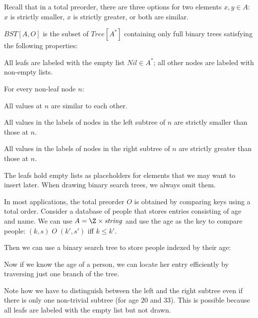 Recall that in a total preorder, there are three options for two elements $x,y\in A$: $x$ is strictly smaller, $x$ is strictly greater, or both are similar.

\begin{definition}
$BST[A,O]$ is the subset of $Tree[A^*]$ containing only full binary trees satisfying the following properties:
\begin{compactitem}
 \item All leafs are labeled with the empty list $Nil\in A^*$; all other nodes are labeled with non-empty lists.
 \item For every non-leaf node $n$:
  \begin{compactitem}
    \item All values at $n$ are similar to each other.
    \item All values in the labels of nodes in the left subtree of $n$ are strictly smaller than those at $n$.
    \item All values in the labels of nodes in the right subtree of $n$ are strictly greater than those at $n$.
  \end{compactitem}
\end{compactitem}
\end{definition}

The leafs hold empty lists as placeholders for elements that we may want to insert later.
When drawing binary search trees, we always omit them.

\begin{example}
In most applications, the total preorder $O$ is obtained by comparing keys using a total order.
Consider a database of people that stores entries consisting of age and name.
We can use $A=\Z\times\String$ and use the age as the key to compare people: $(k,s) \; O \;(k',s')$ iff $k\leq k'$.

Then we can use a binary search tree to store people indexed by their age:
\begin{center}
\end{center}
Now if we know the age of a person, we can locate her entry efficiently by traversing just one branch of the tree.

Note how we have to distinguish between the left and the right subtree even if there is only one non-trivial subtree (for age $20$ and $33$).
This is possible because all leafs are labeled with the empty list but not drawn.
\end{example}

